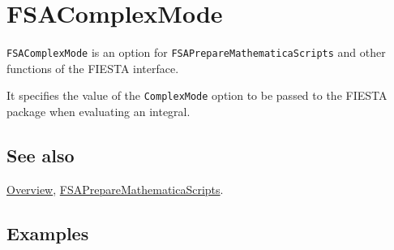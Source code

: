 \documentclass[../FeynHelpersManual.tex]{subfiles}
\begin{document}
\begin{Shaded}
\begin{Highlighting}[]
 
\end{Highlighting}
\end{Shaded}

\hypertarget{fsacomplexmode}{
\section{FSAComplexMode}\label{fsacomplexmode}}

\texttt{FSAComplexMode} is an option for
\texttt{FSAPrepareMathematicaScripts} and other functions of the FIESTA
interface.

It specifies the value of the \texttt{ComplexMode} option to be passed
to the FIESTA package when evaluating an integral.

\subsection{See also}

\hyperlink{toc}{Overview},
\hyperlink{fsapreparemathematicascripts}{FSAPrepareMathematicaScripts}.

\subsection{Examples}
\end{document}
